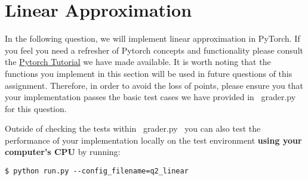 \section{Linear Approximation}

In the following question, we will implement linear approximation in PyTorch. If you feel you need a refresher of Pytorch concepts and functionality please consult the \href{https://colab.research.google.com/drive/1BZ89PnXpzN2US_OxwuQCazucmuTpuIfS?usp=sharing}{Pytorch Tutorial} we have made available. It is worth noting that the functions you implement in this section will be used in future questions of this assignment. Therefore, in order to avoid the loss of points, please ensure you that your implementation passes the basic test cases we have provided in ~grader.py~ for this question.

Outside of checking the tests within ~grader.py~ you can also test the performance of your implementation locally on the test environment \textbf{using your computer's CPU} by running:

\begin{lstlisting}
$ python run.py --config_filename=q2_linear
\end{lstlisting} 

\begin{enumerate}[(a)]

	

	

	

	

	

	

	

\end{enumerate}